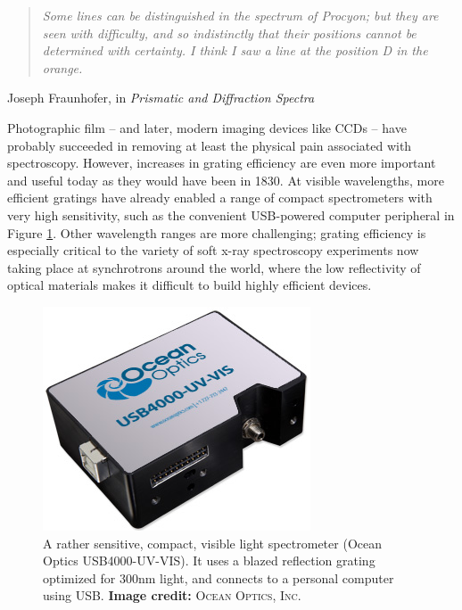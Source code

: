 \begin{quote}
\emph{Some lines can be distinguished in the spectrum of \emph{Procyon}; but they are seen with difficulty, and so indistinctly that their positions cannot be determined with certainty.  I \emph{think} I saw a line at the position D in the orange.}
\end{quote}
\begin{flushright}
Joseph Fraunhofer, in \emph{Prismatic and Diffraction Spectra} \cite[p.~61]{Fra98}
\end{flushright}

Photographic film -- and later, modern imaging devices like CCDs --  have probably succeeded in removing at least the physical pain associated with spectroscopy.  However, increases in grating efficiency are even more important and useful today as they would have been in 1830.  At visible wavelengths, more efficient gratings have already enabled a range of compact spectrometers with very high sensitivity, such as the convenient USB-powered computer peripheral in Figure \ref{1a}.  Other wavelength ranges are more challenging; grating efficiency is especially critical to the variety of soft x-ray spectroscopy experiments now taking place at synchrotrons around the world, where the low reflectivity of optical materials makes it difficult to build highly efficient devices.

\begin{figure}[htbp] %
   \centering
   \includegraphics[scale=0.5]{../data/Chapter1/1a_oceanOptics/1a.jpg} 
   \caption[A rather sensitive, compact, visible light spectrometer (Ocean Optics USB4000-UV-VIS).]{A rather sensitive, compact, visible light spectrometer (Ocean Optics USB4000-UV-VIS).  It uses a blazed reflection grating optimized for 300nm light, and connects to a personal computer using USB.  \textbf{Image credit: }\textsc{Ocean Optics, Inc.} \cite{Oce11}}
   \label{1a}
\end{figure}

